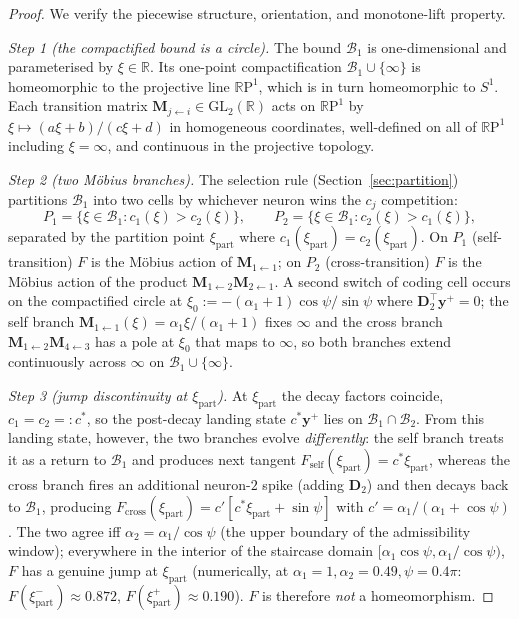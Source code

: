 \documentclass[12pt]{article}
\newcommand{\vv}[1]{\mathbf{#1}}
\newcommand{\DD}{\vv{D}}
\newcommand{\yy}{\vv{y}}
\newcommand{\RR}{\mathbb{R}}
\newcommand{\Bsp}{\mathcal{B}}
\begin{document}
\begin{proof}
We verify the piecewise structure, orientation, and monotone-lift property.

\emph{Step 1 (the compactified bound is a circle).} The bound $\Bsp_1$ is one-dimensional and parameterised by $\xi\in\RR$. Its one-point compactification $\Bsp_1\cup\{\infty\}$ is homeomorphic to the projective line $\mathbb{R}\mathrm{P}^1$, which is in turn homeomorphic to $S^1$. Each transition matrix $\vv{M}_{j\leftarrow i}\in\mathrm{GL}_2(\RR)$ acts on $\mathbb{R}\mathrm{P}^1$ by $\xi\mapsto(a\xi+b)/(c\xi+d)$ in homogeneous coordinates, well-defined on all of $\mathbb{R}\mathrm{P}^1$ including $\xi=\infty$, and continuous in the projective topology.

\emph{Step 2 (two M\"obius branches).} The selection rule (Section~\ref{sec:partition}) partitions $\Bsp_1$ into two cells by whichever neuron wins the $c_j$ competition:
\[
P_1=\{\xi\in\Bsp_1:c_1(\xi)>c_2(\xi)\},\qquad P_2=\{\xi\in\Bsp_1:c_2(\xi)>c_1(\xi)\},
\]
separated by the partition point $\xi_{\mathrm{part}}$ where $c_1(\xi_{\mathrm{part}})=c_2(\xi_{\mathrm{part}})$. On $P_1$ (self-transition) $F$ is the M\"obius action of $\vv{M}_{1\leftarrow 1}$; on $P_2$ (cross-transition) $F$ is the M\"obius action of the product $\vv{M}_{1\leftarrow 2}\vv{M}_{2\leftarrow 1}$. A second switch of coding cell occurs on the compactified circle at $\xi_0:=-(\alpha_1{+}1)\cos\psi/\sin\psi$ where $\DD_2^\top\yy^+=0$; the self branch $\vv{M}_{1\leftarrow 1}(\xi)=\alpha_1\xi/(\alpha_1+1)$ fixes $\infty$ and the cross branch $\vv{M}_{1\leftarrow 2}\vv{M}_{4\leftarrow 3}$ has a pole at $\xi_0$ that maps to $\infty$, so both branches extend continuously across $\infty$ on $\Bsp_1\cup\{\infty\}$.

\emph{Step 3 (jump discontinuity at $\xi_{\mathrm{part}}$).} At $\xi_{\mathrm{part}}$ the decay factors coincide, $c_1=c_2=:c^*$, so the post-decay landing state $c^*\yy^+$ lies on $\Bsp_1\cap\Bsp_2$. From this landing state, however, the two branches evolve \emph{differently}: the self branch treats it as a return to $\Bsp_1$ and produces next tangent $F_{\text{self}}(\xi_{\mathrm{part}})=c^*\xi_{\mathrm{part}}$, whereas the cross branch fires an additional neuron-$2$ spike (adding $\DD_2$) and then decays back to $\Bsp_1$, producing $F_{\text{cross}}(\xi_{\mathrm{part}})=c'[c^*\xi_{\mathrm{part}}+\sin\psi]$ with $c'=\alpha_1/(\alpha_1+\cos\psi)$. The two agree iff $\alpha_2=\alpha_1/\cos\psi$ (the upper boundary of the admissibility window); everywhere in the interior of the staircase domain $[\alpha_1\cos\psi,\alpha_1/\cos\psi)$, $F$ has a genuine jump at $\xi_{\mathrm{part}}$ (numerically, at $\alpha_1{=}1,\alpha_2{=}0.49,\psi{=}0.4\pi$: $F(\xi_{\mathrm{part}}^-)\approx 0.872$, $F(\xi_{\mathrm{part}}^+)\approx 0.190$). $F$ is therefore \emph{not} a homeomorphism.


\end{proof}
\end{document}
